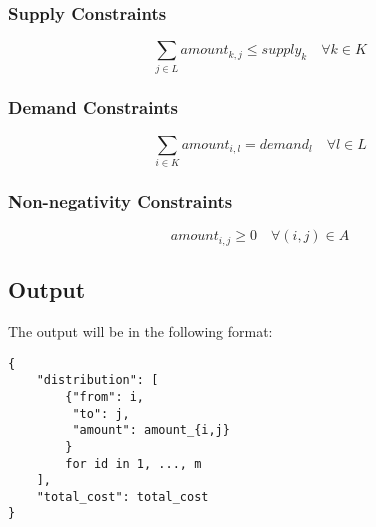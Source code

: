 \documentclass{article}
\begin{document}
\subsubsection*{Supply Constraints}
\[
\sum_{j \in L} amount_{k,j} \leq supply_k \quad \forall k \in K
\]

\subsubsection*{Demand Constraints}
\[
\sum_{i \in K} amount_{i,l} = demand_l \quad \forall l \in L
\]

\subsubsection*{Non-negativity Constraints}
\[
amount_{i,j} \geq 0 \quad \forall (i,j) \in A
\]

\subsection*{Output}
The output will be in the following format:
\begin{verbatim}
{
    "distribution": [
        {"from": i,
         "to": j,
         "amount": amount_{i,j}
        }
        for id in 1, ..., m
    ],
    "total_cost": total_cost
}
\end{verbatim}
\end{document}
